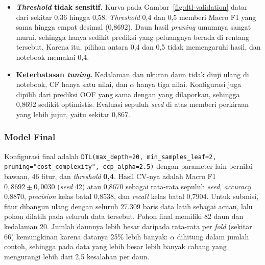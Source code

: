 \begin{itemize}
	nilai kosong dengan \texttt{missing\_predict="distribute"}. Skornya 0,8134. Varian ini sekaligus
	tidak memakai fitur grup pemesanan dan fitur tanggal, serta dibatasi ke kedalaman 10 agar waktunya
	wajar. Karena tiga hal berubah bersamaan, selisihnya tidak dapat dikaitkan dengan satu penyebab saja.
	\item \textbf{\textit{Threshold} tidak sensitif.} Kurva pada Gambar~\ref{fig:dtl-validation} datar
	dari sekitar 0,36 hingga 0,58. \textit{Threshold} 0,4 dan 0,5 memberi Macro F1 yang sama hingga
	empat desimal (0,8692). Daun hasil \textit{pruning} umumnya sangat murni, sehingga hanya sedikit
	prediksi yang peluangnya berada di rentang tersebut. Karena itu, pilihan antara 0,4 dan 0,5 tidak
	memengaruhi hasil, dan notebook memakai 0,4.
	\item \textbf{Keterbatasan \textit{tuning}.} Kedalaman dan ukuran daun tidak diuji ulang di
	notebook, CF hanya satu nilai, dan $\alpha$ hanya tiga nilai. Konfigurasi juga dipilih dari
	prediksi OOF yang sama dengan yang dilaporkan, sehingga 0,8692 sedikit optimistis. Evaluasi sepuluh
	\textit{seed} di atas memberi perkiraan yang lebih jujur, yaitu sekitar 0,867.
\end{itemize}

\subsubsection{Model Final}

Konfigurasi final adalah \texttt{DTL(max\_depth=20, min\_samples\_leaf=2,
pruning="cost\_complexity", ccp\_alpha=2.5)} dengan parameter lain bernilai bawaan, 46 fitur, dan
\textit{threshold} \textbf{0,4}. Hasil CV-nya adalah Macro F1 $0{,}8692 \pm 0{,}0030$
(\textit{seed} 42) atau 0,8670 sebagai rata-rata sepuluh \textit{seed}, \textit{accuracy} 0,8870,
\textit{precision} kelas batal 0,8538, dan \textit{recall} kelas batal 0,7904. Untuk submisi, fitur
dibangun ulang dengan seluruh 27.309 baris data latih sebagai acuan, lalu pohon dilatih pada seluruh
data tersebut. Pohon final memiliki 82 daun dan kedalaman 20. Jumlah daunnya lebih besar daripada
rata-rata per \textit{fold} (sekitar 66) kemungkinan karena datanya 25\% lebih banyak: $\alpha$
dihitung dalam jumlah contoh, sehingga pada data yang lebih besar lebih banyak cabang yang mengurangi
lebih dari 2,5 kesalahan per daun.

